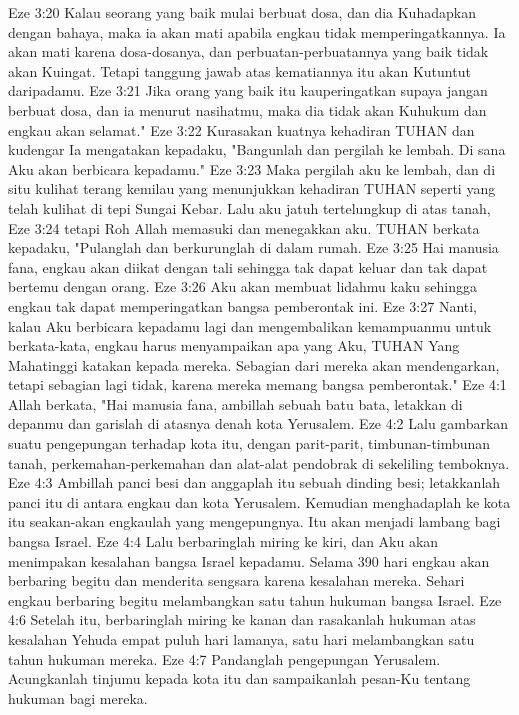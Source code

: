Eze 3:20  Kalau seorang yang baik mulai berbuat dosa, dan dia Kuhadapkan dengan bahaya, maka ia akan mati apabila engkau tidak memperingatkannya. Ia akan mati karena dosa-dosanya, dan perbuatan-perbuatannya yang baik tidak akan Kuingat. Tetapi tanggung jawab atas kematiannya itu akan Kutuntut daripadamu.
Eze 3:21  Jika orang yang baik itu kauperingatkan supaya jangan berbuat dosa, dan ia menurut nasihatmu, maka dia tidak akan Kuhukum dan engkau akan selamat."
Eze 3:22  Kurasakan kuatnya kehadiran TUHAN dan kudengar Ia mengatakan kepadaku, "Bangunlah dan pergilah ke lembah. Di sana Aku akan berbicara kepadamu."
Eze 3:23  Maka pergilah aku ke lembah, dan di situ kulihat terang kemilau yang menunjukkan kehadiran TUHAN seperti yang telah kulihat di tepi Sungai Kebar. Lalu aku jatuh tertelungkup di atas tanah,
Eze 3:24  tetapi Roh Allah memasuki dan menegakkan aku. TUHAN berkata kepadaku, "Pulanglah dan berkurunglah di dalam rumah.
Eze 3:25  Hai manusia fana, engkau akan diikat dengan tali sehingga tak dapat keluar dan tak dapat bertemu dengan orang.
Eze 3:26  Aku akan membuat lidahmu kaku sehingga engkau tak dapat memperingatkan bangsa pemberontak ini.
Eze 3:27  Nanti, kalau Aku berbicara kepadamu lagi dan mengembalikan kemampuanmu untuk berkata-kata, engkau harus menyampaikan apa yang Aku, TUHAN Yang Mahatinggi katakan kepada mereka. Sebagian dari mereka akan mendengarkan, tetapi sebagian lagi tidak, karena mereka memang bangsa pemberontak."
Eze 4:1  Allah berkata, "Hai manusia fana, ambillah sebuah batu bata, letakkan di depanmu dan garislah di atasnya denah kota Yerusalem.
Eze 4:2  Lalu gambarkan suatu pengepungan terhadap kota itu, dengan parit-parit, timbunan-timbunan tanah, perkemahan-perkemahan dan alat-alat pendobrak di sekeliling temboknya.
Eze 4:3  Ambillah panci besi dan anggaplah itu sebuah dinding besi; letakkanlah panci itu di antara engkau dan kota Yerusalem. Kemudian menghadaplah ke kota itu seakan-akan engkaulah yang mengepungnya. Itu akan menjadi lambang bagi bangsa Israel.
Eze 4:4  Lalu berbaringlah miring ke kiri, dan Aku akan menimpakan kesalahan bangsa Israel kepadamu. Selama 390 hari engkau akan berbaring begitu dan menderita sengsara karena kesalahan mereka. Sehari engkau berbaring begitu melambangkan satu tahun hukuman bangsa Israel.
Eze 4:6  Setelah itu, berbaringlah miring ke kanan dan rasakanlah hukuman atas kesalahan Yehuda empat puluh hari lamanya, satu hari melambangkan satu tahun hukuman mereka.
Eze 4:7  Pandanglah pengepungan Yerusalem. Acungkanlah tinjumu kepada kota itu dan sampaikanlah pesan-Ku tentang hukuman bagi mereka.
